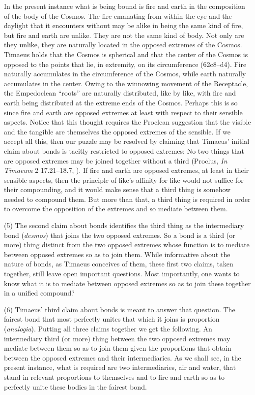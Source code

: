 In the present instance what is being bound is fire and earth in the composition of the body of the Cosmos. The fire emanating from within the eye and the daylight that it encounters without may be alike in being the same kind of fire, but fire and earth are unlike. They are not the same kind of body. Not only are they unlike, they are naturally located in the opposed extremes of the Cosmos. Timaeus holds that the Cosmos is spherical and that the center of the Cosmos is opposed to the points that lie, in extremity, on its circumference (62c8–d4). Fire naturally accumulates in the circumference of the Cosmos, while earth naturally accumulates in the center. Owing to the winnowing movement of the Receptacle, the Empedoclean ``roots'' are naturally distributed, like by like, with fire and earth being distributed at the extreme ends of the Cosmos. Perhaps this is so since fire and earth are opposed extremes at least with respect to their sensible aspects. Notice that this thought requires the Proclean suggestion that the visible and the tangible are themselves the opposed extremes of the sensible. If we accept all this, then our puzzle may be resolved by claiming that Timaeus' initial claim about bonds is tacitly restricted to opposed extremes: No two things that are opposed extremes may be joined together without a third (Proclus, \emph{In Timaeum} 2 17.21--18.7, \citealt{Diehl:1903re}). If fire and earth are opposed extremes, at least in their sensible aspects, then the principle of like's affinity for like would not suffice for their compounding, and it would make sense that a third thing is somehow needed to compound them. But more than that, a third thing is required in order to overcome the opposition of the extremes and so mediate between them.

(5) The second claim about bonds identifies the third thing as the intermediary bond (\emph{desmos}) that joins the two opposed extremes. So a bond is a third (or more) thing distinct from the two opposed extremes whose function is to mediate between opposed extremes so as to join them. While informative about the nature of bonds, as Timaeus conceives of them, these first two claims, taken together, still leave open important questions. Most importantly, one wants to know what it is to mediate between opposed extremes so as to join these together in a unified compound? 

(6) Timaeus' third claim about bonds is meant to answer that question. The fairest bond that most perfectly unites that which it joins is proportion (\emph{analogia}). Putting all three claims together we get the following. An intermediary third (or more) thing between the two opposed extremes may mediate between them so as to join them given the proportions that obtain between the opposed extremes and their intermediaries. As we shall see, in the present instance, what is required are two intermediaries, air and water, that stand in relevant proportions to themselves and to fire and earth so as to perfectly unite these bodies in the fairest bond.

